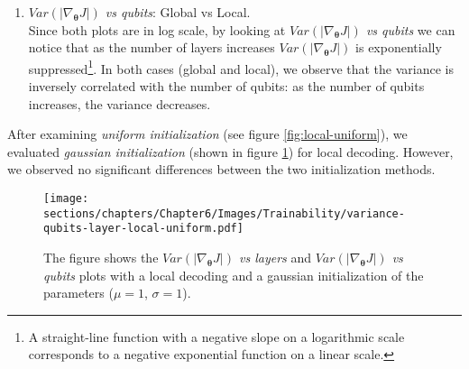 \begin{enumerate}
    \item \textit{$Var(|\nabla_{\bm{\theta}}J|)$ vs qubits}: Global vs Local.\\
    Since both plots are in log scale, by looking at 
    \textit{$Var(|\nabla_{\bm{\theta}}J|)$ vs qubits} we can notice that as the number of layers increases 
    $Var(|\nabla_{\bm{\theta}}J|)$ is exponentially suppressed\footnote[1]{A straight-line function 
    with a negative slope on a logarithmic scale corresponds to a negative exponential function 
    on a linear scale.}. 
    In both cases (global and local), we observe that the variance 
    is inversely correlated with the number of qubits: as the number of qubits increases, 
    the variance decreases.
\end{enumerate}


After examining \textit{uniform initialization} (see figure \ref{fig:local-uniform}), we evaluated 
\textit{gaussian initialization} (shown in figure \ref{fig:local-gauss}) for local decoding. However, 
we observed no significant differences between the two initialization methods.


\begin{figure}[h]
    \centering
    \texttt{[image: sections/chapters/Chapter6/Images/Trainability/variance-qubits-layer-local-uniform.pdf]}
    \caption{The figure shows the \textit{$Var(|\nabla_{\bm{\theta}}J|)$ vs layers} and
    \textit{$Var(|\nabla_{\bm{\theta}}J|)$ vs qubits} plots with a local decoding
    and a gaussian initialization of the parameters ($\mu = 1$, $\sigma = 1$).}
    \label{fig:local-gauss}
\end{figure}
